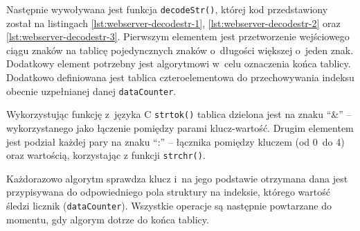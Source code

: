 

\FloatBarrier

Następnie wywoływana jest funkcja \texttt{decodeStr()}, której kod przedstawiony został na listingach
\ref{lst:webserver-decodestr-1}, \ref{lst:webserver-decodestr-2} oraz \ref{lst:webserver-decodestr-3}. Pierwszym
elementem jest przetworzenie wejściowego ciągu znaków na tablicę pojedyncznych znaków o~długości większej o~jeden znak.
Dodatkowy element potrzebny jest algorytmowi w~celu oznaczenia końca tablicy. Dodatkowo definiowana jest tablica
czteroelementowa do przechowywania indeksu obecnie uzpełnianej danej \texttt{dataCounter}.


Wykorzystując funkcję z~języka C \texttt{strtok()} tablica dzielona jest na znaku \enquote{\&} -- wykorzystanego jako
łączenie pomiędzy parami klucz-wartość. Drugim elementem jest podział każdej pary na znaku \enquote{:} -- łącznika
pomiędzy kluczem (od 0~do 4) oraz wartością, korzystając z funkcji \texttt{strchr()}.


\FloatBarrier
Każdorazowo algorytm sprawdza klucz i~na jego podstawie otrzymana dana jest przypisywana do odpowiedniego pola struktury
na indeksie, którego wartość śledzi licznik (\texttt{dataCounter}). Wszystkie operacje są następnie powtarzane do
momentu, gdy algorym dotrze do końca tablicy.
